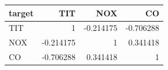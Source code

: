 \begin{tabular}{lrrr}
\toprule
target & TIT & NOX & CO \\
\midrule
TIT & 1 & -0.214175 & -0.706288 \\
NOX & -0.214175 & 1 & 0.341418 \\
CO & -0.706288 & 0.341418 & 1 \\
\bottomrule
\end{tabular}
